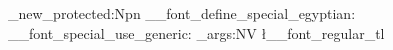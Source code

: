 \RequirePackage{xsr-detector-active}
\RequirePackage{xsr-egyptian}
\ExplSyntaxOn
\cs_new_protected:Npn \__font_define_special_egyptian:
  {
    \__font_special_use_generic:
    \exp_args:NV \xsrEgyptianDefaultFont \l__font_regular_tl
  }
\NewDocumentCommand {}
  {  }
\ExplSyntaxOff
\endinput
